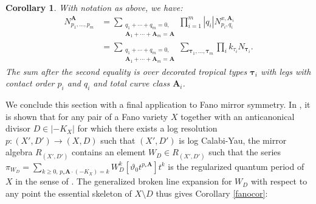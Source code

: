\documentclass[12pt, oneside]{amsart}   	%
\newcounter{thm}
\newtheorem{corollary}[thm]{Corollary}
\numberwithin{equation}{section}
\numberwithin{thm}{section}
\numberwithin{figure}{section}
\begin{document}
 \begin{corollary}
 With notation as above, we have:
 \begin{equation}
 \begin{split}
 N_{p_1,\ldots,p_m}^{\textbf{A}} &= \sum_{\substack{q_1+\cdots+q_m = 0,\\\textbf{A}_1+\cdots+\textbf{A}_m = \textbf{A}}} \prod_{i=1}^m |q_i|N^{x,\textbf{A}_i}_{p_i,q_i}\\
 &=  \sum_{\substack{q_1+\cdots+q_m = 0,\\
 \textbf{A}_1+\cdots+\textbf{A}_m = \textbf{A}}}\sum_{\pmb\tau_1,\dots,\pmb\tau_{m}}\prod_i k_{\tau_i}N_{\pmb\tau_i}.
 \end{split}
 \end{equation}
 The sum after the second equality is over decorated tropical types $\pmb\tau_i$ with legs with contact order $p_i$ and $q_i$ and total curve class $\textbf{A}_i$. 
 \end{corollary}
  
We conclude this section with a final application to Fano mirror symmetry. In \cite{qpint}, it is shown that for any pair of a Fano variety $X$ together with an anticanonical divisor $D \in |-K_X|$ for which there exists a log resolution $p: (X',D') \rightarrow (X,D)$ such that $(X',D')$ is log Calabi-Yau, the mirror algebra $R_{(X',D')}$ contains an element $W_D \in R_{(X',D')}$ such that the series $\pi_{W_D} = \sum_{k \ge 0\text{, }p_*\textbf{A}\cdot (-K_X) = k} W_D^k[\vartheta_0t^{p_*\textbf{A}}]t^k$ is the regularized quantum period of $X$ in the sense of \cite{fanmir}. The generalized broken line expansion for $W_D$ with respect to any point the essential skeleton of $X\setminus D$ thus gives Corollary \ref{fanocor}:
  
\end{document}
